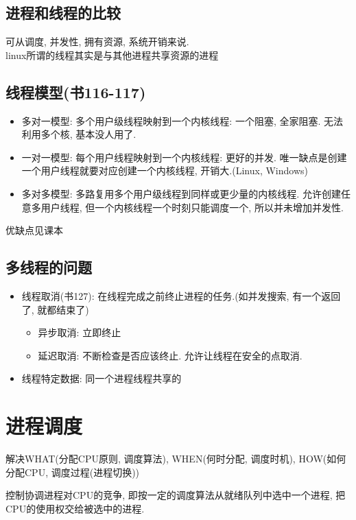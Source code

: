 \documentclass[a4paper, UTF8]{article}
\begin{document}
\subsection{进程和线程的比较}
可从调度, 并发性, 拥有资源, 系统开销来说.\\
linux所谓的线程其实是与其他进程共享资源的进程

\subsection{线程模型(书116-117)}
\begin{itemize}
\item 多对一模型: 多个用户级线程映射到一个内核线程: 一个阻塞, 全家阻塞. 无法利用多个核, 基本没人用了.
\item 一对一模型: 每个用户线程映射到一个内核线程: 更好的并发. 唯一缺点是创建一个用户线程就要对应创建一个内核线程, 开销大.(Linux, Windows)
\item 多对多模型: 多路复用多个用户级线程到同样或更少量的内核线程. 允许创建任意多用户线程, 但一个内核线程一个时刻只能调度一个, 所以并未增加并发性.
\end{itemize}
优缺点见课本

\subsection{多线程的问题}
\begin{itemize}
\item 线程取消(书127): 在线程完成之前终止进程的任务.(如并发搜索, 有一个返回了, 就都结束了)
	\begin{itemize}
	\item 异步取消: 立即终止
	\item 延迟取消: 不断检查是否应该终止. 允许让线程在安全的点取消.
	\end{itemize}
\item 线程特定数据: 同一个进程线程共享的
\end{itemize}
\newpage
\section{进程调度}
解决WHAT(分配CPU原则, 调度算法), WHEN(何时分配, 调度时机), HOW(如何分配CPU, 调度过程(进程切换))\par

控制协调进程对CPU的竞争, 即按一定的调度算法从就绪队列中选中一个进程, 把CPU的使用权交给被选中的进程.\par
\end{document}
